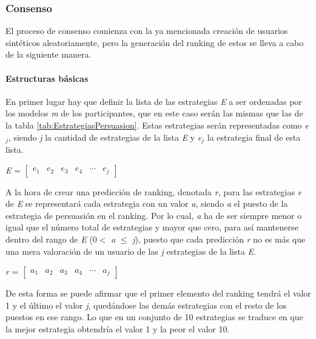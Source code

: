 \subsubsection{Consenso}
El proceso de consenso comienza con la ya mencionada creación de usuarios sintéticos aleatoriamente, pero la generación del ranking de estos se lleva a cabo de la siguiente manera.

\paragraph{Estructuras básicas} En primer lugar hay que definir la lista de las estrategias \textit{E} a ser ordenadas por los modelos \textit{m} de los participantes, que en este caso serán las mismas que las de la tabla \ref{tab:EstrategiasPersuasion}. Estas estrategias serán representadas como \textit{e$_{j}$}, siendo \textit{j} la cantidad de estrategias de la lista \textit{E} y \textit{e$_{j}$} la estrategia final de esta lista. 
\begin{center}
    \textit{E} = $\begin{bmatrix} \textit{e$_{1}$} & \textit{e$_{2}$} & \textit{e$_{3}$} & \textit{e$_{4}$} & \cdots & \textit{e$_{j}$} \end{bmatrix}$ 
\end{center}
A la hora de crear una predicción de ranking, denotada \textit{r}, para las estrategias \textit{e} de \textit{E} se representará cada estrategia con un valor \textit{a}, siendo \textit{a} el puesto de la estrategia de persuasión en el ranking. Por lo cual, \textit{a} ha de ser siempre menor o igual que el número total de estrategias y mayor que cero, para así mantenerse dentro del rango de \textit{E} (0$<$
\textit{a }$\leq$\textit{ j}), puesto que cada predicción \textit{r} no es más que una mera valoración de un usuario de las \textit{j} estrategias de la lista \textit{E}.
\begin{center}
    \textit{r} = $\begin{bmatrix} \textit{a$_{1}$} & \textit{a$_{2}$} & \textit{a$_{3}$} & \textit{a$_{4}$} & \cdots & \textit{a$_{j}$} \end{bmatrix}$ 
\end{center}
De esta forma se puede afirmar que el primer elemento del ranking tendrá el valor 1 y el último el valor \textit{j}, quedándose las demás estrategias con el resto de los puestos en ese rango. Lo que en un conjunto de 10 estrategias se traduce en que la mejor estrategia obtendría el valor 1 y la peor el valor 10.
\\ \\
